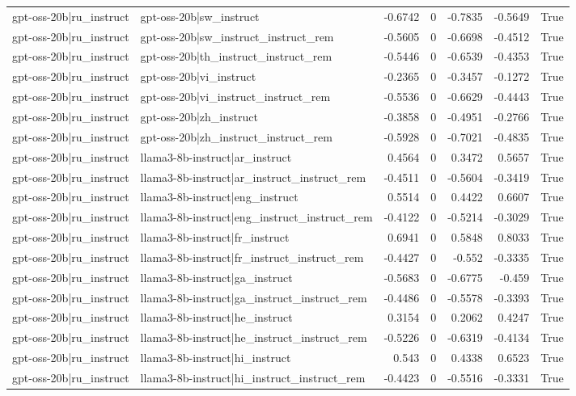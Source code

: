 \begin{table}
\begin{tabular}{l l r r r r l}
gpt-oss-20b|ru_instruct & gpt-oss-20b|sw_instruct & -0.6742 & 0 & -0.7835 & -0.5649 & True \\
gpt-oss-20b|ru_instruct & gpt-oss-20b|sw_instruct_instruct_rem & -0.5605 & 0 & -0.6698 & -0.4512 & True \\
gpt-oss-20b|ru_instruct & gpt-oss-20b|th_instruct_instruct_rem & -0.5446 & 0 & -0.6539 & -0.4353 & True \\
gpt-oss-20b|ru_instruct & gpt-oss-20b|vi_instruct & -0.2365 & 0 & -0.3457 & -0.1272 & True \\
gpt-oss-20b|ru_instruct & gpt-oss-20b|vi_instruct_instruct_rem & -0.5536 & 0 & -0.6629 & -0.4443 & True \\
gpt-oss-20b|ru_instruct & gpt-oss-20b|zh_instruct & -0.3858 & 0 & -0.4951 & -0.2766 & True \\
gpt-oss-20b|ru_instruct & gpt-oss-20b|zh_instruct_instruct_rem & -0.5928 & 0 & -0.7021 & -0.4835 & True \\
gpt-oss-20b|ru_instruct & llama3-8b-instruct|ar_instruct & 0.4564 & 0 & 0.3472 & 0.5657 & True \\
gpt-oss-20b|ru_instruct & llama3-8b-instruct|ar_instruct_instruct_rem & -0.4511 & 0 & -0.5604 & -0.3419 & True \\
gpt-oss-20b|ru_instruct & llama3-8b-instruct|eng_instruct & 0.5514 & 0 & 0.4422 & 0.6607 & True \\
gpt-oss-20b|ru_instruct & llama3-8b-instruct|eng_instruct_instruct_rem & -0.4122 & 0 & -0.5214 & -0.3029 & True \\
gpt-oss-20b|ru_instruct & llama3-8b-instruct|fr_instruct & 0.6941 & 0 & 0.5848 & 0.8033 & True \\
gpt-oss-20b|ru_instruct & llama3-8b-instruct|fr_instruct_instruct_rem & -0.4427 & 0 & -0.552 & -0.3335 & True \\
gpt-oss-20b|ru_instruct & llama3-8b-instruct|ga_instruct & -0.5683 & 0 & -0.6775 & -0.459 & True \\
gpt-oss-20b|ru_instruct & llama3-8b-instruct|ga_instruct_instruct_rem & -0.4486 & 0 & -0.5578 & -0.3393 & True \\
gpt-oss-20b|ru_instruct & llama3-8b-instruct|he_instruct & 0.3154 & 0 & 0.2062 & 0.4247 & True \\
gpt-oss-20b|ru_instruct & llama3-8b-instruct|he_instruct_instruct_rem & -0.5226 & 0 & -0.6319 & -0.4134 & True \\
gpt-oss-20b|ru_instruct & llama3-8b-instruct|hi_instruct & 0.543 & 0 & 0.4338 & 0.6523 & True \\
gpt-oss-20b|ru_instruct & llama3-8b-instruct|hi_instruct_instruct_rem & -0.4423 & 0 & -0.5516 & -0.3331 & True \\

\end{tabular}
\end{table}
